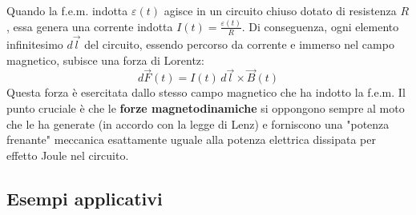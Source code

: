 \documentclass{book}
\begin{document}
Quando la f.e.m. indotta $\varepsilon(t)$ agisce in un circuito chiuso dotato di resistenza $R$, essa genera una corrente indotta $I(t)=\frac{\varepsilon(t)}{R}$. Di conseguenza, ogni elemento infinitesimo $d\vec{l}$ del circuito, essendo percorso da corrente e immerso nel campo magnetico, subisce una forza di Lorentz:
$$d\vec{F}(t)=I(t)\,d\vec{l} \times \vec{B}(t)$$
Questa forza è esercitata dallo stesso campo magnetico che ha indotto la f.e.m.
Il punto cruciale è che le \textbf{forze magnetodinamiche} si oppongono sempre al moto che le ha generate (in accordo con la legge di Lenz) e forniscono una "potenza frenante" meccanica esattamente uguale alla potenza elettrica dissipata per effetto Joule nel circuito.

\subsection{Esempi applicativi}
\end{document}
